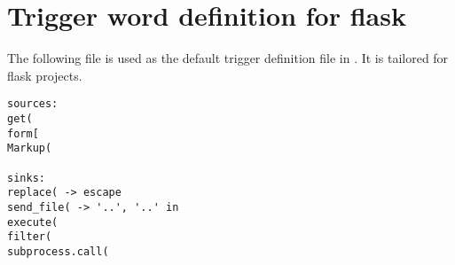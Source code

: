 \chapter{Trigger word definition for flask}\label{appendix:trigger_word_flask}
The following file is used as the default trigger definition file in \pyt{}.
It is tailored for flask projects.

\begin{lstlisting}[style=python, caption={Trigger word definition for flask projects}, label={flask_trigger_words}]
sources:
get(
form[
Markup(

sinks:
replace( -> escape
send_file( -> '..', '..' in
execute(
filter(
subprocess.call(
\end{lstlisting}

